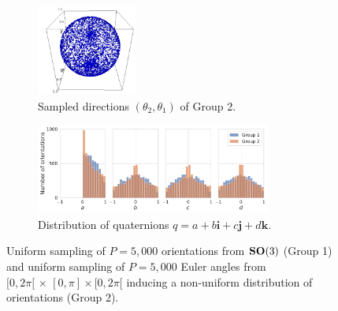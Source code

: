 \begin{figure}[ht!]
\begin{subfigure}[b]{0.18\linewidth}
    \end{subfigure}
    \hfill
    \begin{subfigure}[b]{0.18\linewidth}
        \centering
        \includegraphics[height=8em]{figures/uniform_angles.png}
        \caption{Sampled directions $(\theta_2, \theta_1)$ of Group 2.}
    \end{subfigure}
    \hfill
    \begin{subfigure}[b]{0.62\linewidth}
        \centering
        \includegraphics[height=8em]{figures/uniform_quaternions_vs_angles_q.pdf}
        \caption{Distribution of quaternions $q = a + b\boldsymbol{i} + c\boldsymbol{j} + d\boldsymbol{k}$.}
    \end{subfigure}
    \caption{%
        Uniform sampling of $P=5,000$ orientations from $\mathrm{\mathbf{SO}}(3)$ (Group 1) and uniform sampling of $P=5,000$ Euler angles from $[0,2\pi[ \, \times \, [0,\pi] \times [0,2\pi[$ inducing a non-uniform distribution of orientations (Group 2).
    }\label{fig:uniform-orientations}
\end{figure}

